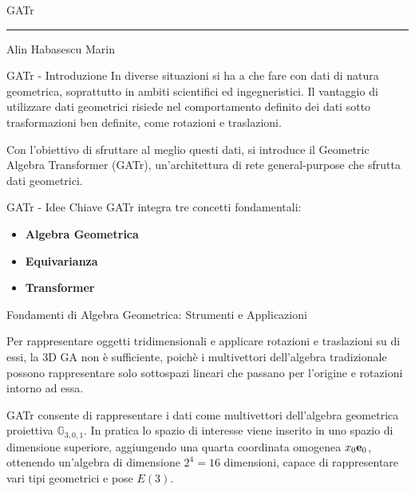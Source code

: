 \begin{frame}
    \Huge GATr
    \rule{\textwidth}{.25pt}
    \small{Alin Habasescu Marin}
\end{frame}
\begin{frame}{GATr - Introduzione}
    In diverse situazioni si ha a che fare con dati di natura geometrica, soprattutto
    in ambiti scientifici ed ingegneristici. Il vantaggio di utilizzare dati geometrici
    risiede nel comportamento definito dei dati sotto trasformazioni ben definite, come 
    rotazioni e traslazioni.

    Con l'obiettivo di sfruttare al meglio questi dati, si introduce il 
    Geometric Algebra Transformer (GATr), un'architettura di rete general-purpose 
    che sfrutta dati geometrici. 
\end{frame}

\begin{frame}{GATr - Idee Chiave}
    GATr integra tre concetti fondamentali:
    \begin{itemize}
        \item \textbf{Algebra Geometrica}
        \item \textbf{Equivarianza}
        \item \textbf{Transformer}
    \end{itemize}
\end{frame}

\begin{frame}{Fondamenti di Algebra Geometrica: Strumenti e Applicazioni}

    Per rappresentare oggetti tridimensionali e applicare rotazioni e traslazioni su di 
    essi, la 3D GA non è sufficiente, poichè i multivettori dell'algebra tradizionale 
    possono rappresentare solo sottospazi lineari che passano per l'origine e rotazioni 
    intorno ad essa. 

    GATr consente di rappresentare i dati come multivettori dell'algebra geometrica 
    proiettiva \(\mathbb{G}_{3,0,1}\). In pratica lo spazio di interesse viene inserito 
    in uno spazio di dimensione superiore, aggiungendo una quarta coordinata omogenea 
    \(x_0 \mathbf{e}_{0}\), ottenendo un'algebra di dimensione \(2^4 = 16\) dimensioni, capace di 
    rappresentare vari tipi geometrici e pose \(E(3)\).
\end{frame}

